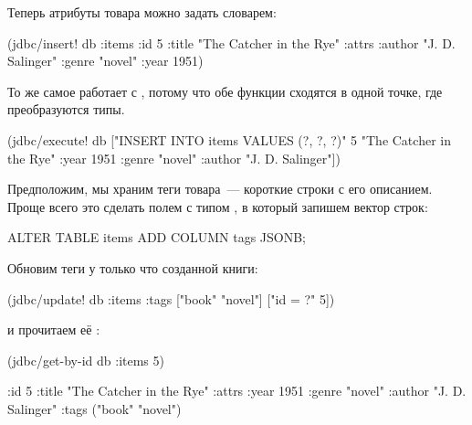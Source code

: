 Теперь атрибуты товара можно задать словарем:

\begin{english}
  \begin{clojure}
(jdbc/insert! db :items
              {:id 5
               :title "The Catcher in the Rye"
               :attrs {:author "J. D. Salinger"
                       :genre "novel"
                       :year 1951}})
  \end{clojure}
\end{english}

То же самое работает с , потому что обе функции сходятся в одной точке, где преобразуются типы.

\begin{english}
  \begin{clojure}
(jdbc/execute!
  db
  ["INSERT INTO items VALUES (?, ?, ?)"
  5
  "The Catcher in the Rye"
  {:year 1951 :genre "novel"
   :author "J. D. Salinger"}])
  \end{clojure}
\end{english}

Предположим, мы храним теги товара~--- короткие строки с его описанием. Проще всего это сделать полем  с типом , в который запишем вектор строк:

\begin{english}
  \begin{sql}
ALTER TABLE items ADD COLUMN tags JSONB;
  \end{sql}
\end{english}

Обновим теги у только что созданной книги:

\begin{english}
  \begin{clojure}
(jdbc/update! db :items
              {:tags ["book" "novel"]}
              ["id = ?" 5])
  \end{clojure}
\end{english}

\noindent
и прочитаем её :

\begin{english}
  \begin{clojure/lines}
(jdbc/get-by-id db :items 5)

{:id 5
 :title "The Catcher in the Rye"
 :attrs {:year 1951 :genre "novel"
         :author "J. D. Salinger"}
 :tags ("book" "novel")}
  \end{clojure/lines}
\end{english}

